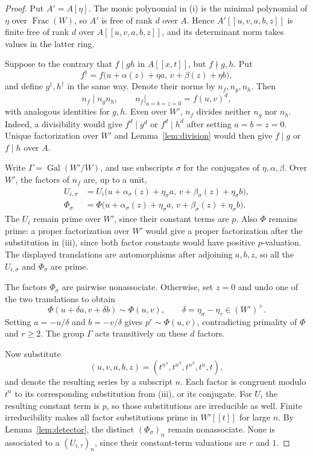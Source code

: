\documentclass[11pt]{amsart}
\theoremstyle{remark}
\DeclareMathOperator{\Frac}{Frac}
\begin{document}
\begin{proof}
Put $A'=A[\eta]$. The monic polynomial in (i) is the minimal
polynomial of $\eta$ over $\Frac(W)$, so $A'$ is free of rank
$d$ over $A$. Hence $A'[[u,v,a,b,z]]$ is finite free of rank $d$
over $A[[u,v,a,b,z]]$, and its determinant norm takes values in
the latter ring.

Suppose to the contrary that $f\mid gh$ in $A[[x,t]]$, but
$f\nmid g,h$. Put
\[
 f^\dagger=f\bigl(u+\alpha(z)+\eta a,\,
                       v+\beta(z)+\eta b\bigr),
\]
and define $g^\dagger,h^\dagger$ in the same way. Denote their
norms by $n_f,n_g,n_h$. Then
\[
 n_f\mid n_gn_h,\qquad
 n_f\big|_{a=b=z=0}=f(u,v)^d,
\]
with analogous identities for $g,h$. Even over $W'$, $n_f$ divides
neither $n_g$ nor $n_h$. Indeed, a divisibility would give
$f^d\mid g^d$ or $f^d\mid h^d$ after setting $a=b=z=0$.
Unique factorization over $W'$ and Lemma~\ref{lem:division}
would then give $f\mid g$ or $f\mid h$ over $A$.

Write $\Gamma=\operatorname{Gal}(W'/W)$, and use subscripts
$\sigma$ for the conjugates of $\eta,\alpha,\beta$. Over $W'$,
the factors of $n_f$ are, up to a unit,
\begin{align*}
 U_{i,\sigma}&=U_i\bigl(u+\alpha_\sigma(z)+\eta_\sigma a,\,
                            v+\beta_\sigma(z)+\eta_\sigma b\bigr),\\
 \Phi_\sigma&=\Phi\bigl(u+\alpha_\sigma(z)+\eta_\sigma a,\,
                            v+\beta_\sigma(z)+\eta_\sigma b\bigr).
\end{align*}
The $U_i$ remain prime over $W'$, since their constant terms are
$p$. Also $\Phi$ remains prime: a proper factorization over $W'$
would give a proper factorization after the substitution in (iii),
since both factor constants would have positive $p$-valuation.
The displayed translations are automorphisms after adjoining
$a,b,z$, so all the $U_{i,\sigma}$ and $\Phi_\sigma$ are prime.

The factors $\Phi_\sigma$ are pairwise nonassociate. Otherwise,
set $z=0$ and undo one of the two translations to obtain
\[
 \Phi(u+\delta a,v+\delta b)\sim\Phi(u,v),\qquad
 \delta=\eta_\sigma-\eta_\tau\in(W')^\times.
\]
Setting $a=-u/\delta$ and $b=-v/\delta$ gives
$p^r\sim\Phi(u,v)$, contradicting primality of $\Phi$ and
$r\geq2$. The group $\Gamma$ acts transitively on these $d$ factors.

Now substitute
\[
 (u,v,a,b,z)=(t^{n^4},t^{n^3},t^{n^2},t^n,t),
\]
and denote the resulting series by a subscript $n$. Each factor
is congruent modulo $t^n$ to its corresponding substitution from
(iii), or its conjugate. For $U_i$ the resulting constant term is
$p$, so those substitutions are irreducible as well. Finite
irreducibility makes all factor substitutions prime in $W'[[t]]$
for large $n$. By Lemma~\ref{lem:detector}, the distinct
$(\Phi_\sigma)_n$ remain nonassociate. None is associated to
a $(U_{i,\tau})_n$, since their constant-term valuations are
$r$ and $1$.


\end{proof}
\end{document}
